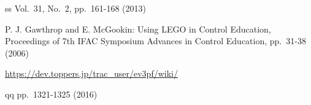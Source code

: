 \small
\begin{thebibliography}{99}
	\setlength{\itemsep}{0pt}
	\smallskip
	
	ss
	Vol.~31, No.~2, pp.~161-168 (2013)
	
	P. J. Gawthrop and E. McGookin: 
	Using LEGO in Control Education, 
	Proceedings of 7th IFAC Symposium Advances in Control Education, pp.~31-38 (2006)
	
	\url{https://dev.toppers.jp/trac_user/ev3pf/wiki/}
	
	qq
	pp.~1321-1325 (2016)
\end{thebibliography}
\normalsize
